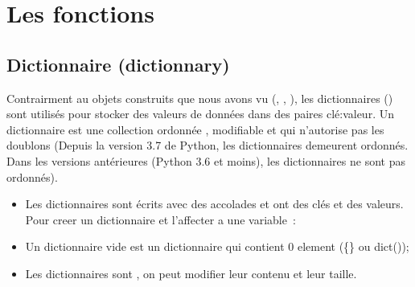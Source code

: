 \documentclass[letterpaper,10pt,french]{sphinxmanual}
\begin{document}
\section{Les fonctions}
\label{\detokenize{ch6:les-fonctions}}\label{\detokenize{ch6::doc}}

\subsection{Dictionnaire (dictionnary)}
\label{\detokenize{ch6:dictionnaire-dictionnary}}
\sphinxAtStartPar
Contrairment au objets construits que nous avons vu (, , ), les dictionnaires () sont utilisés pour stocker des valeurs de données dans des paires clé:valeur. Un dictionnaire est une collection ordonnée , modifiable et qui n’autorise pas les doublons (Depuis la version 3.7 de Python, les dictionnaires demeurent ordonnés. Dans les versions antérieures (Python 3.6 et moins), les dictionnaires ne sont pas ordonnés).
\begin{itemize}
\item {} 
\sphinxAtStartPar
Les dictionnaires sont écrits avec des accolades et ont des clés et des valeurs.  Pour creer un dictionnaire et l’affecter a une variable :

\end{itemize}

\begin{sphinxVerbatim}[commandchars=\\\{\}]
     
\end{sphinxVerbatim}
\begin{itemize}
\item {} 
\sphinxAtStartPar
Un dictionnaire vide est un dictionnaire qui contient 0 element (\{\} ou dict());

\item {} 
\sphinxAtStartPar
Les dictionnaires sont , on peut modifier leur contenu et leur taille.

\end{itemize}
\end{document}
